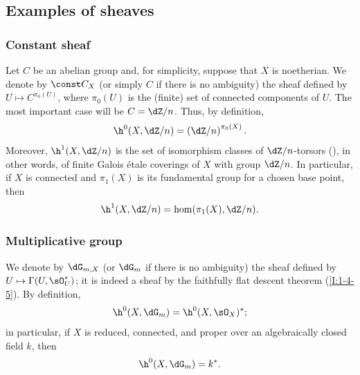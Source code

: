 \subsection{Examples of sheaves}\label{I:2-2}

\subsubsection{Constant sheaf}\label{I:2-2-1}

Let $C$ be an abelian group and, for simplicity, suppose that $X$ is
noetherian. We denote by $\const C_X$ (or simply $C$ if there is no
ambiguity) the sheaf defined by $U\mapsto C^{\pi_0(U)}$, where
$\pi_0(U)$ is the (finite) set of connected components of $U$. The most
important case will be $C=\dZ/n$. Thus, by definition,
\[
  \h^0(X,\dZ/n)=\left(\dZ/n\right)^{\pi_0(X)}\text{.}
\]
Moreover, $\h^1(X,\dZ/n)$ is the set of isomorphism classes of
$\dZ/n$-torsors (), in other words, of finite Galois étale
coverings of $X$ with group $\dZ/n$. In particular, if $X$ is connected
and $\pi_1(X)$ is its fundamental group for a chosen base point, then
\[
  \h^1(X,\dZ/n) = \hom(\pi_1(X),\dZ/n)\text{.}
\]

\subsubsection{Multiplicative group}\label{I:2-2-2}

We denote by $\dG_{m,X}$ (or $\dG_m$ if there is no ambiguity) the sheaf
defined by $U\mapsto\Gamma(U,\sO_U^*)$; it is indeed a sheaf by the
faithfully flat descent theorem (\ref{I:1-4-5}). By definition,
\[
  \h^0(X,\dG_m) = \h^0(X,\sO_X)^*\text{;}
\]
in particular, if $X$ is reduced, connected, and proper over an
algebraically closed field $k$, then
\[
  \h^0(X,\dG_m) = k^*\text{.}
\]

